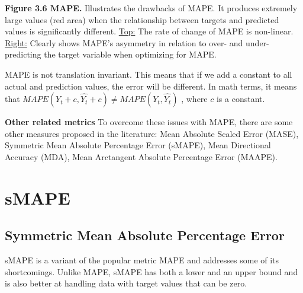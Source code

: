 \textbf{Figure 3.6 MAPE.} Illustrates the drawbacks of MAPE. It produces extremely large values (red area) when the relationship between
targets and predicted values is significantly different. \underline{Top:} The rate of change of MAPE is non-linear.
\underline{Right:} Clearly shows MAPE's asymmetry in relation to over- and under-predicting the target variable when optimizing for MAPE.

{MAPE is not translation invariant. This means that if we add a constant to all actual and prediction values, the error will be different.
In math terms, it means that $MAPE(Y_{t} + c, \hat{Y_{t}} + c) \not= MAPE(Y_{t}, \hat{Y_{t}})$ , where $c$ is a constant.}


\textbf{Other related metrics}
To overcome these issues with MAPE, there are some other measures proposed in the literature: Mean Absolute Scaled Error (MASE),
Symmetric Mean Absolute Percentage Error (sMAPE), Mean Directional Accuracy (MDA), Mean Arctangent Absolute Percentage Error (MAAPE).

\clearpage
\thispagestyle{regressionstyle}
\section{sMAPE}
\subsection{Symmetric Mean Absolute Percentage Error}

sMAPE is a variant of the popular metric MAPE and addresses some of its shortcomings. Unlike MAPE, sMAPE has both a lower and an upper bound and is also better
at handling data with target values that can be zero.

\vspace{0.5em}
\begin{center}
\end{center}

